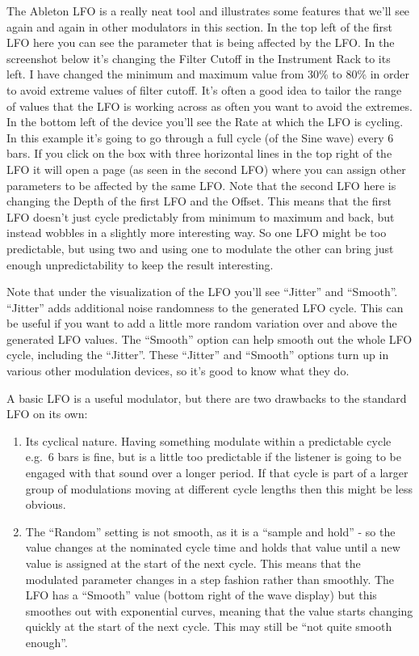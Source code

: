 \documentclass[
  12pt,
  letterpaper,
  oneside,
  open=any]{scrbook}
\makeatletter
\newcommand*\pandocbounded[1]{%
  \sbox\pandoc@box{#1}%
  \Gscale@div\@tempa{\textheight}{\dimexpr\ht\pandoc@box+\dp\pandoc@box\relax}%
  \Gscale@div\@tempb{\linewidth}{\wd\pandoc@box}%
  \ifdim\@tempb\p@<\@tempa\p@\let\@tempa\@tempb\fi%
  \ifdim\@tempa\p@<\p@\scalebox{\@tempa}{\usebox\pandoc@box}%
  \else\usebox{\pandoc@box}%
  \fi%
}
\makeatother
\begin{document}
The Ableton LFO is a really neat tool and illustrates some features that
we'll see again and again in other modulators in this section. In the
top left of the first LFO here you can see the parameter that is being
affected by the LFO. In the screenshot below it's changing the Filter
Cutoff in the Instrument Rack to its left. I have changed the minimum
and maximum value from 30\% to 80\% in order to avoid extreme values of
filter cutoff. It's often a good idea to tailor the range of values that
the LFO is working across as often you want to avoid the extremes. In
the bottom left of the device you'll see the Rate at which the LFO is
cycling. In this example it's going to go through a full cycle (of the
Sine wave) every 6 bars. If you click on the box with three horizontal
lines in the top right of the LFO it will open a page (as seen in the
second LFO) where you can assign other parameters to be affected by the
same LFO. Note that the second LFO here is changing the Depth of the
first LFO and the Offset. This means that the first LFO doesn't just
cycle predictably from minimum to maximum and back, but instead wobbles
in a slightly more interesting way. So one LFO might be too predictable,
but using two and using one to modulate the other can bring just enough
unpredictability to keep the result interesting.

\pandocbounded{\texttt{[image: images/LFO.png]}}

Note that under the visualization of the LFO you'll see ``Jitter'' and
``Smooth''. ``Jitter'' adds additional noise randomness to the generated
LFO cycle. This can be useful if you want to add a little more random
variation over and above the generated LFO values. The ``Smooth'' option
can help smooth out the whole LFO cycle, including the ``Jitter''. These
``Jitter'' and ``Smooth'' options turn up in various other modulation
devices, so it's good to know what they do.

A basic LFO is a useful modulator, but there are two drawbacks to the
standard LFO on its own:

\begin{enumerate}
\def\labelenumi{\arabic{enumi}.}
\item
  Its cyclical nature. Having something modulate within a predictable
  cycle e.g.~6 bars is fine, but is a little too predictable if the
  listener is going to be engaged with that sound over a longer period.
  If that cycle is part of a larger group of modulations moving at
  different cycle lengths then this might be less obvious.
\item
  The ``Random'' setting is not smooth, as it is a ``sample and hold'' -
  so the value changes at the nominated cycle time and holds that value
  until a new value is assigned at the start of the next cycle. This
  means that the modulated parameter changes in a step fashion rather
  than smoothly. The LFO has a ``Smooth'' value (bottom right of the
  wave display) but this smoothes out with exponential curves, meaning
  that the value starts changing quickly at the start of the next cycle.
  This may still be ``not quite smooth enough''.
\end{enumerate}
\end{document}
